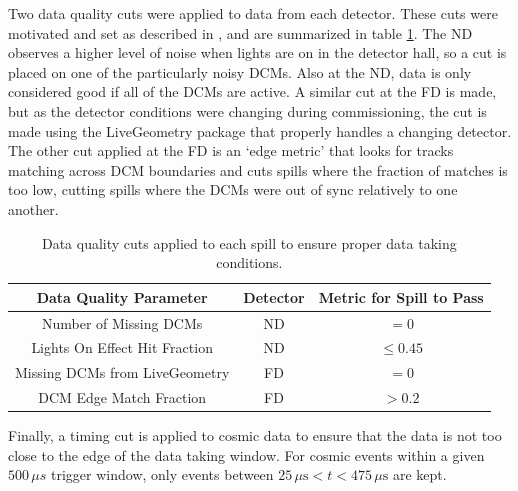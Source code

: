 Two data quality cuts were applied to data from each detector. These cuts were motivated and set as described in \cite{ref:DQND, ref:DQFDDCMLiveGeo, ref:DQFDDCMEdgeFrac}, and are summarized in table \ref{tab:DataQual}. The ND observes a higher level of noise when lights are on in the detector hall, so a cut is placed on one of the particularly noisy DCMs. Also at the ND, data is only considered good if all of the DCMs are active. A similar cut at the FD is made, but as the detector conditions were changing during commissioning, the cut is made using the LiveGeometry package that properly handles a changing detector. The other cut applied at the FD is an `edge metric' that looks for tracks matching across DCM boundaries and cuts spills where the fraction of matches is too low, cutting spills where the DCMs were out of sync relatively to one another.
\begin{table}[htb]
  \begin{center}
    \caption[Data Quality Cuts]{Data quality cuts applied to each spill to ensure proper data taking conditions.}
    \label{tab:DataQual}
    \begin{tabular}{c c c}
      \hline\hline
      Data Quality Parameter & Detector & Metric for Spill to Pass \\
      \hline
      Number of Missing DCMs & ND & $= 0$ \\
      Lights On Effect Hit Fraction & ND & $\leq 0.45$ \\
      Missing DCMs from LiveGeometry & FD & $= 0$ \\
      DCM Edge Match Fraction & FD & $> 0.2$ \\
      \hline
    \end{tabular}
  \end{center}
\end{table}

Finally, a timing cut is applied to cosmic data to ensure that the data is not too close to the edge of the data taking window. For cosmic events within a given $500\,\mu s$ trigger window, only events between $25\,\mu{\mbox{s}} < t < 475\,\mu{\mbox{s}}$ are kept.

